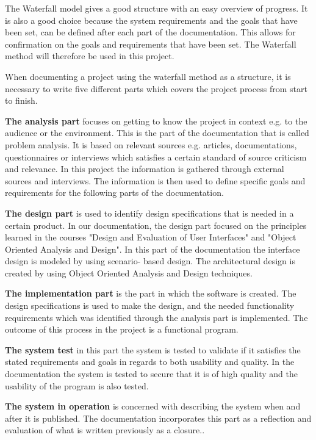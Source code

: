 The Waterfall model gives a good structure with an easy overview of progress. It is also a good choice because the system requirements and the goals that have been set, can be defined after each part of the documentation. This allows for confirmation on the goals and requirements that have been set. The Waterfall method will therefore be used in this project.       

When documenting a project using the waterfall method as a structure, it is necessary to write five different parts which covers the project process from start to finish.

\textbf{The analysis part} focuses on getting to know the project in context e.g. to the audience or the environment. This is the part of the documentation that is called problem analysis. It is based on relevant sources e.g. articles, documentations, questionnaires or interviews which satisfies a certain standard of source criticism and relevance. In this project the information is gathered through external sources and interviews. The information is then used to define specific goals and requirements for the following parts of the documentation.

\textbf{The design part} is used to identify design specifications that is needed in a certain product. In our documentation, the design part focused on the principles learned in the courses "Design and Evaluation of User Interfaces" and "Object Oriented Analysis and Design". In this part of the documentation the interface design is modeled by using scenario- based design. The architectural design is created by using Object Oriented Analysis and Design techniques. 

\textbf{The implementation part} is the part in which the software is created. The design specifications is used to make the design, and the needed functionality requirements which was identified through the analysis part is implemented. The outcome of this process in the project is a functional program.

\textbf{The system test} in this part the system is tested to validate if it satisfies the stated requirements and goals in regards to both usability and quality. In the documentation the system is tested to secure that it is of high quality and the usability of the program is also tested. 

\textbf{The system in operation} is concerned with describing the system when and after it is published. The documentation incorporates this part as a reflection and evaluation of what is written previously as a closure.. 